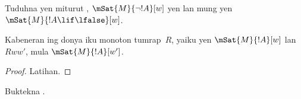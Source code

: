 \documentclass[../../../include/open-logic-section]{subfiles}
\begin{document}
\begin{prob}
  Tuduhna yen miturut ,
  $\mSat{M}{\lnot !A}[w]$ yen lan mung yen $\mSat{M}{!A \lif \lfalse}[w]$.
\end{prob}

\begin{prop}
  Kabeneran ing donya iku monoton tumrap~$R$, yaiku yen
  $\mSat{M}{!A}[w]$ lan $Rww'$, mula $\mSat{M}{!A}[w']$.
\end{prop}

\begin{proof}
  Latihan.
\end{proof}

\begin{prob}
  Buktekna .
\end{prob}
\end{document}
